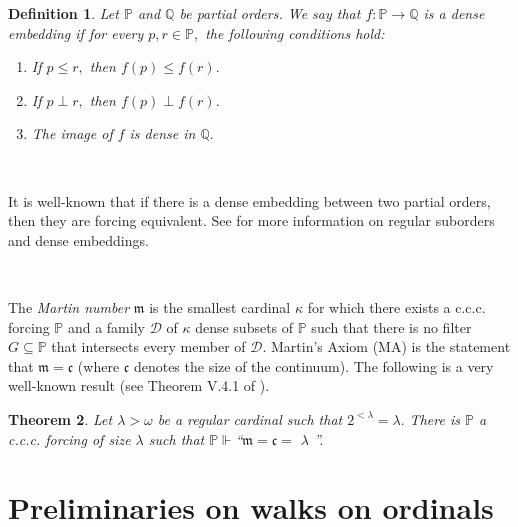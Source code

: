 \documentclass{article}
\newtheorem{theorem}{Theorem}
\newtheorem{definition}[theorem]{Definition}
\begin{document}
\begin{definition}
Let $\mathbb{P}$ and $\mathbb{Q}$ be partial orders. We say that
$f:\mathbb{P\longrightarrow Q}$ \emph{is a dense embedding} if for every
$p,r\in\mathbb{P},$ the following conditions hold:

\begin{enumerate}
\item If $p\leq r,$ then $f\left(  p\right)  \leq f\left(  r\right)  .$

\item If $p\perp r,$ then $f\left(  p\right)  \perp f\left(  r\right)  .$

\item The image of $f$ is dense in $\mathbb{Q}.$
\end{enumerate}
\end{definition}

\qquad\qquad\ \qquad\ \ \ 

It is well-known that if there is a dense embedding between two partial
orders, then they are forcing equivalent. See \cite{Kunen} for more
information on regular suborders and dense embeddings.

\qquad\ \qquad\ \ \ \ \ \ \ \qquad\ \ \ 

The \emph{Martin number }$\mathfrak{m}$ is the smallest cardinal $\kappa$ for
which there exists a \textsf{c.c.c. }forcing $\mathbb{P}$ and a family
$\mathcal{D}$ of $\kappa$ dense subsets of $\mathbb{P}$ such that there is no
filter $G\subseteq\mathbb{P}$ that intersects every member of $\mathcal{D}.$
\textsf{Martin's Axiom} (\textsf{MA}) is the statement that $\mathfrak{m=c}$
(where $\mathfrak{c}$ denotes the size of the continuum). The following is a
very well-known result (see Theorem V.4.1 of \cite{Kunen}).

\begin{theorem}
Let $\lambda>\omega$ be a regular cardinal such that $2^{<\lambda}=\lambda.$
There is $\mathbb{P}$ a \textsf{c.c.c.} forcing of size $\lambda$ such that
$\mathbb{P}\Vdash$\textquotedblleft$\mathfrak{m=c=}$ $\lambda$%
\textquotedblright. \label{Teo forzar Martin}
\end{theorem}

\section{Preliminaries on walks on ordinals}
\end{document}
